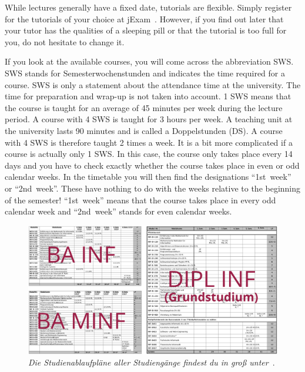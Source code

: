 \pagebreak

While lectures generally have a fixed date, tutorials are flexible.
Simply register for the tutorials of your choice at jExam~.
However, if you find out later that your tutor has the qualities of a sleeping pill or that the tutorial is too full for you, do not hesitate to change it.

If you look at the available courses, you will come across the abbreviation SWS. SWS stands for Semesterwochenstunden and indicates the time required for a course. SWS is only a statement about the attendance time at the university. The time for preparation and wrap-up is not taken into account. 1 SWS means that the course is taught for an average of 45 minutes per week during the lecture period. A course with 4 SWS is taught for 3 hours per week. A teaching unit at the university lasts 90 minutes and is called a Doppelstunden (DS). A course with 4 SWS is therefore taught 2 times a week. It is a bit more complicated if a course is actually only 1 SWS. In this case, the course only takes place every 14 days and you have to check exactly whether the course takes place in even or odd calendar weeks. In the timetable you will then find the designations \enquote{1st\ week} or \enquote{2nd\ week}. These have nothing to do with the weeks relative to the beginning of the semester! \enquote{1st\ week} means that the course takes place in every odd calendar week and \enquote{2nd\ week} stands for even calendar weeks.
\begin{figure}
	\includegraphics[width=\textwidth]{img/alle_studienablaufplaene.png}
	\caption*{\small \textit{Die Studienablaufpläne aller Studiengänge findest du in groß unter}~.}
\end{figure}


